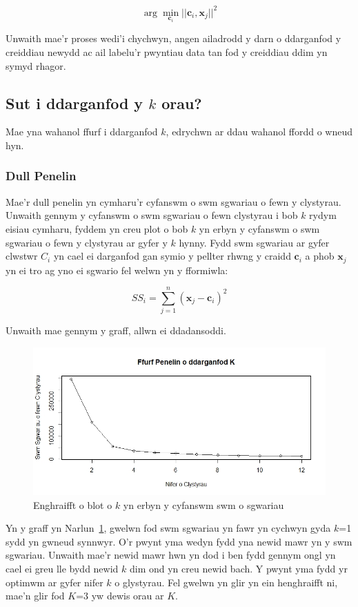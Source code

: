 \begin{equation}
\arg \min_{\mathbf{c}_i} ||\mathbf{c}_i, \mathbf{x}_j||^2
\end{equation}

Unwaith mae'r proses wedi'i chychwyn, angen ailadrodd y darn o ddarganfod y creiddiau newydd ac ail labelu'r pwyntiau data tan fod y creiddiau ddim yn symyd rhagor.

\subsection{Sut i ddarganfod y $k$ orau?}

Mae yna wahanol ffurf i ddarganfod $k$, edrychwn ar ddau wahanol ffordd o wneud hyn. 

\subsubsection{Dull Penelin}

Mae'r dull penelin yn cymharu'r cyfanswm o swm sgwariau o fewn y clystyrau. Unwaith gennym y cyfanswm o swm sgwariau o fewn clystyrau i bob $k$ rydym eisiau cymharu, fyddem yn creu plot o bob $k$ yn erbyn y cyfanswm o swm sgwariau o fewn y clystyrau ar gyfer y $k$ hynny. Fydd swm sgwariau ar gyfer clwstwr $C_{i}$ yn cael ei darganfod gan symio y pellter rhwng y craidd $\mathbf{c}_i$ a phob $\mathbf{x}_j$ yn ei tro ag yno ei sgwario fel welwn yn y fformiwla:

$$ SS_{i} = \sum_{j=1}^{n} (\mathbf{x}_{j}-\mathbf{c}_i)^{2} $$

Unwaith mae gennym y graff, allwn ei ddadansoddi. 

\begin{figure}[H]
\begin{center}
\includegraphics[width=0.5\linewidth]{../img/Dull_Penelin.jpeg}
\caption{Enghraifft o blot o $k$ yn erbyn y cyfanswm swm o sgwariau}
\label{fig:dullpenelin}
\end{center}
\end{figure}

Yn y graff yn Narlun~\ref{fig:dullpenelin}, gwelwn fod swm sgwariau yn fawr yn cychwyn gyda $k$=1 sydd yn gwneud synnwyr. %
O'r pwynt yma wedyn fydd yna newid mawr yn y swm sgwariau. Unwaith mae'r newid mawr hwn yn dod i ben fydd gennym ongl yn cael ei greu lle bydd newid $k$ dim ond yn creu newid bach. Y pwynt yma fydd yr optimwm ar gyfer nifer $k$ o glystyrau. Fel gwelwn yn glir yn ein henghraifft ni, mae'n glir fod $K$=3 yw dewis orau ar $K$.

